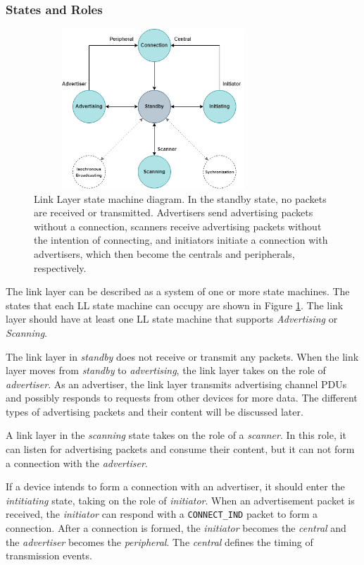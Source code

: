 \subsubsection{States and Roles}
\begin{figure}[]
    \centering
    \includegraphics[width=0.8\textwidth,height=6cm,keepaspectratio=true]{images/ll_states/ll_states.drawio.png}
    \caption{
        Link Layer state machine diagram. In the standby state, no packets are received or transmitted. Advertisers send advertising packets without a connection, scanners receive advertising packets without the intention of connecting, and initiators initiate a connection with advertisers, which then become the centrals and peripherals, respectively.
    }
    \label{fig:ll_states}
\end{figure}
The link layer can be described as a system of one or more state machines. The states that each LL state machine can occupy are shown in Figure \ref{fig:ll_states}. The link layer should have at least one LL state machine that supports \textit{Advertising} or \textit{Scanning}. 

The link layer in \textit{standby} does not receive or transmit any packets. When the link layer moves from \textit{standby} to \textit{advertising}, the link layer takes on the role of \textit{advertiser}. As an advertiser, the link layer transmits advertising channel PDUs and possibly responds to requests from other devices for more data. The different types of advertising packets and their content will be discussed later.

A link layer in the \textit{scanning} state takes on the role of a \textit{scanner}. In this role, it can listen for advertising packets and consume their content, but it can not form a connection with the \textit{advertiser}.

If a device intends to form a connection with an advertiser, it should enter the \textit{intitiating} state, taking on the role of \textit{initiator}. When an advertisement packet is received, the \textit{initiator} can respond with a \texttt{CONNECT\_IND} packet to form a connection. After a connection is formed, the \textit{initiator} becomes the \textit{central} and the \textit{advertiser} becomes the \textit{peripheral}. The \textit{central} defines the timing of transmission events.

